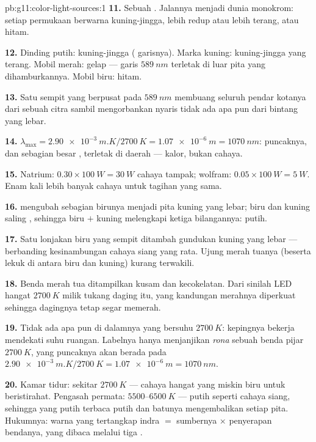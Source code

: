 \begin{solution}{pb:g11:color-light-sources:1}
\textbf{11.} Sebuah . Jalannya menjadi dunia
monokrom: setiap permukaan berwarna kuning-jingga, lebih redup atau
lebih terang, atau hitam.

\textbf{12.} Dinding putih: kuning-jingga ( garisnya).
Marka kuning: kuning-jingga yang terang. Mobil merah: gelap --- garis
$\qty{589}{nm}$ terletak di luar pita yang dihamburkannya. Mobil biru:
hitam.

\textbf{13.} Satu  sempit yang berpusat pada $\qty{589}{nm}$
membuang seluruh pendar kotanya dari sebuah citra sambil mengorbankan
nyaris tidak ada apa pun dari  bintang yang lebar.

\textbf{14.} $\lambda_{\max} = \qty{2.90e-3}{m.K}/\qty{2700}{K} =
\qty{1.07e-6}{m} = \qty{1070}{nm}$: puncaknya, dan sebagian besar
, terletak di daerah  --- kalor, bukan cahaya.

\textbf{15.} Natrium: $0.30 \times \qty{100}{W} = \qty{30}{W}$ cahaya
tampak; wolfram: $0.05 \times \qty{100}{W} = \qty{5}{W}$. Enam kali
lebih banyak cahaya untuk tagihan yang sama.

\textbf{16.}  mengubah sebagian birunya menjadi pita kuning
yang lebar; biru dan kuning saling , sehingga biru $+$
kuning melengkapi ketiga bilangannya: putih.

\textbf{17.} Satu lonjakan biru yang sempit ditambah gundukan kuning
yang lebar --- berbanding kesinambungan cahaya siang yang rata. Ujung
merah tuanya (beserta lekuk di antara biru dan kuning) kurang terwakili.

\textbf{18.} Benda merah tua ditampilkan kusam dan kecokelatan. Dari
sinilah LED hangat $\qty{2700}{K}$ milik tukang daging itu, yang
kandungan merahnya diperkuat sehingga dagingnya tetap segar memerah.

\textbf{19.} Tidak ada apa pun di dalamnya yang bersuhu
$\qty{2700}{K}$: kepingnya bekerja mendekati suhu ruangan. Labelnya
hanya menjanjikan \emph{rona} sebuah benda pijar $\qty{2700}{K}$, yang
puncaknya akan berada pada
$\qty{2.90e-3}{m.K}/\qty{2700}{K} = \qty{1.07e-6}{m} = \qty{1070}{nm}$.

\textbf{20.} Kamar tidur: sekitar $\qty{2700}{K}$ --- cahaya hangat
yang miskin biru untuk beristirahat. Pengasah permata:
$5500$--$\qty{6500}{K}$ --- putih seperti cahaya siang, sehingga yang
putih terbaca putih dan batunya mengembalikan setiap pita. Hukumnya:
warna yang tertangkap indra $=$  sumbernya $\times$ penyerapan
bendanya, yang dibaca melalui tiga .
\end{solution}
